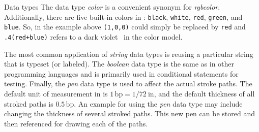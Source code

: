 \begin{section}{Data types}
The data type \textit{color} is a convenient synonym for
\textit{rgbcolor}.  Additionally, there are five built-in \RGB{} colors
in \MP{}: \texttt{black}, \texttt{white}, \texttt{red}, \texttt{green},
and \texttt{blue}.  So, in the example above \texttt{(1,0,0)} could
simply be replaced by \texttt{red} and \texttt{.4(red+blue)} refers to a
dark violet~ in the \RGB{} color model.

The most common application of \textit{string} data types is reusing a
particular string that is typeset (or labeled).  The \textit{boolean}
data type is the same as in other programming languages and is primarily used in
conditional statements for testing.  Finally, the \textit{pen} data type
is used to affect the actual stroke paths.  The default unit of
measurement in \MP{} is $1\,\mathrm{bp}=1/72\mathrm{\ in}$, and the
default thickness of all stroked paths is $0.5\,\mathrm{bp}$.  An
example for using the \textit{pen} data type may include changing the
thickness of several stroked paths.  This new pen can be stored and then
referenced for drawing each of the paths.
\end{section}

